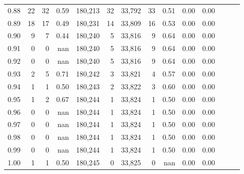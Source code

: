 \begin{tabular}{rrrrrrrrrrrrrr}
0.88 &      22 &     32 &  0.59 &  180,213 &       32 &  33,792 &      33 &  0.51 &  0.00 &      0.00 \\
0.89 &      18 &     17 &  0.49 &  180,231 &       14 &  33,809 &      16 &  0.53 &  0.00 &      0.00 \\
0.90 &       9 &      7 &  0.44 &  180,240 &        5 &  33,816 &       9 &  0.64 &  0.00 &      0.00 \\
0.91 &       0 &      0 &   nan &  180,240 &        5 &  33,816 &       9 &  0.64 &  0.00 &      0.00 \\
0.92 &       0 &      0 &   nan &  180,240 &        5 &  33,816 &       9 &  0.64 &  0.00 &      0.00 \\
0.93 &       2 &      5 &  0.71 &  180,242 &        3 &  33,821 &       4 &  0.57 &  0.00 &      0.00 \\
0.94 &       1 &      1 &  0.50 &  180,243 &        2 &  33,822 &       3 &  0.60 &  0.00 &      0.00 \\
0.95 &       1 &      2 &  0.67 &  180,244 &        1 &  33,824 &       1 &  0.50 &  0.00 &      0.00 \\
0.96 &       0 &      0 &   nan &  180,244 &        1 &  33,824 &       1 &  0.50 &  0.00 &      0.00 \\
0.97 &       0 &      0 &   nan &  180,244 &        1 &  33,824 &       1 &  0.50 &  0.00 &      0.00 \\
0.98 &       0 &      0 &   nan &  180,244 &        1 &  33,824 &       1 &  0.50 &  0.00 &      0.00 \\
0.99 &       0 &      0 &   nan &  180,244 &        1 &  33,824 &       1 &  0.50 &  0.00 &      0.00 \\
1.00 &       1 &      1 &  0.50 &  180,245 &        0 &  33,825 &       0 &   nan &  0.00 &      0.00 \\
\bottomrule
\end{tabular}
